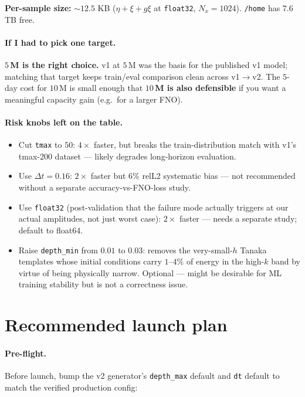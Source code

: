 \documentclass[11pt]{article}
\begin{document}
\textbf{Per-sample size:} $\sim\!12.5$ KB ($\eta + \xi + g\xi$ at \texttt{float32},
$N_x = 1024$). \texttt{/home} has $7.6$\,TB free.

\paragraph{If I had to pick one target.} \textbf{$5$\,M is the right choice.} v1 at $5$\,M
was the basis for the published v1 model; matching that target keeps train/eval
comparison clean across v1$\to$v2. The $5$-day cost for $10$\,M is small enough that
\textbf{$10$\,M is also defensible} if you want a meaningful capacity gain
(e.g.\ for a larger FNO).

\paragraph{Risk knobs left on the table.}
\begin{itemize}
\item Cut \texttt{tmax} to $50$: $4\times$ faster, but breaks the train-distribution
  match with v1's tmax-200 dataset --- likely degrades long-horizon evaluation.
\item Use $\Delta t = 0.16$: $2\times$ faster but $6\%$ relL2 systematic bias --- not
  recommended without a separate accuracy-vs-FNO-loss study.
\item Use \texttt{float32} (post-validation that the failure mode actually triggers
  at our actual amplitudes, not just worst case): $2\times$ faster --- needs a
  separate study; default to float64.
\item Raise \texttt{depth\_min} from $0.01$ to $0.03$: removes the very-small-$h$
  Tanaka templates whose initial conditions carry $1$--$4\%$ of energy in the
  high-$k$ band by virtue of being physically narrow. Optional --- might be
  desirable for ML training stability but is not a correctness issue.
\end{itemize}

\section{Recommended launch plan}
\label{sec:launch}

\paragraph{Pre-flight.} Before launch, bump the v2 generator's \texttt{depth\_max}
default and \texttt{dt} default to match the verified production config:
\end{document}

